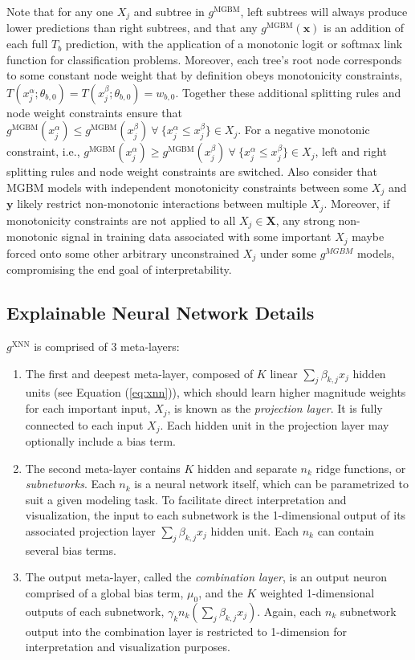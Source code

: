 \documentclass[information,article,accept,moreauthors,pdftex]{Definitions/mdpi}
\begin{document}
 Note that for any one $X_j$ and subtree in $g^{\text{MGBM}}$, left subtrees will always produce lower predictions than right subtrees, and that any $g^{\text{MGBM}}(\mathbf{x})$ is an addition of each full $T_b$ prediction, with the application of a monotonic logit or softmax link function for classification problems. Moreover, each tree's root node corresponds to some constant node weight that by definition obeys monotonicity constraints, $ T(x^{\alpha}_j; \theta_{b,0}) = T(x^{\beta}_j; \theta_{b,0}) = w_{b,0}$. Together these additional splitting rules and node weight constraints ensure that $g^{\text{MGBM}}(x^{\alpha}_j) \le g^{\text{MGBM}}(x^{\beta}_j) ~\forall~ \{x^{\alpha}_j \le x^{\beta}_j\} \in X_j$. For a negative monotonic constraint, i.e., $g^{\text{MGBM}}(x^{\alpha}_j)  \ge g^{\text{MGBM}}(x^{\beta}_j) ~\forall~ \{x^{\alpha}_j \le x^{\beta}_j\} \in X_j$, left and right splitting rules and node weight constraints are switched. Also consider that MGBM models with independent monotonicity constraints between some $X_j$ and $\mathbf{y}$ likely restrict non-monotonic interactions between multiple $X_j$. Moreover, if monotonicity constraints are not applied to all $X_j \in \mathbf{X}$, any strong non-monotonic signal in training data associated with some important $X_j$ maybe forced onto some other arbitrary unconstrained $X_j$ under some $g^{MGBM}$ models, compromising the end goal of interpretability.

\subsection{Explainable Neural Network Details}\label{a_ssec:xnn}

 

 $g^{\text{XNN}}$ is comprised of 3 meta-layers:

\begin{enumerate}[leftmargin=*,labelsep=4.9mm]
	\item The first and deepest meta-layer, composed of $K$ linear $\sum_j\beta_{k,j}x_j$ hidden units (see Equation (\ref{eq:xnn})), which should learn higher magnitude weights for each important input, $X_j$, is known as the \textit{projection layer}. It is fully connected to each input $X_j$. Each hidden unit in the projection layer may optionally include a bias term.
	\item The second meta-layer contains $K$ hidden and separate $n_k$ ridge functions, or \textit{subnetworks}. Each $n_k$ is a neural network itself, which can be parametrized to suit a given modeling task. To facilitate direct interpretation and visualization, the input to each subnetwork is the 1-dimensional output of its associated projection layer $\sum_j\beta_{k,j}x_j$ hidden unit. Each $n_k$ can contain several bias terms.
	\item The output meta-layer, called the \textit{combination layer}, is an output neuron comprised of a global bias term, $\mu_0$, and the $K$ weighted 1-dimensional outputs of each subnetwork, $\gamma_kn_k(\sum_j\beta_{k,j}x_j)$. Again, each $n_k$ subnetwork output into the combination layer is restricted to 1-dimension for interpretation and visualization purposes.
\end{enumerate}
\end{document}

